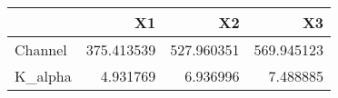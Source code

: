 \begin{tabular}{lrrr}
\toprule
{} &          X1 &          X2 &          X3 \\
\midrule
Channel &  375.413539 &  527.960351 &  569.945123 \\
K\_alpha &    4.931769 &    6.936996 &    7.488885 \\
\bottomrule
\end{tabular}

